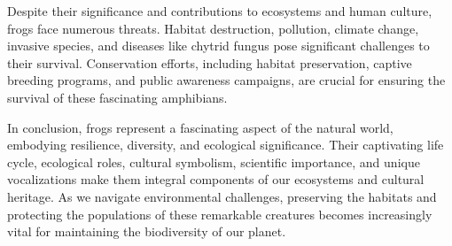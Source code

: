 \documentclass[twocolumn, 9pt]{extarticle}
\begin{document}
Despite their significance and contributions to ecosystems and human culture, frogs face numerous threats. Habitat destruction, pollution, climate change, invasive species, and diseases like chytrid fungus pose significant challenges to their survival. Conservation efforts, including habitat preservation, captive breeding programs, and public awareness campaigns, are crucial for ensuring the survival of these fascinating amphibians.

In conclusion, frogs represent a fascinating aspect of the natural world, embodying resilience, diversity, and ecological significance. Their captivating life cycle, ecological roles, cultural symbolism, scientific importance, and unique vocalizations make them integral components of our ecosystems and cultural heritage. As we navigate environmental challenges, preserving the habitats and protecting the populations of these remarkable creatures becomes increasingly vital for maintaining the biodiversity of our planet.




\end{document}
